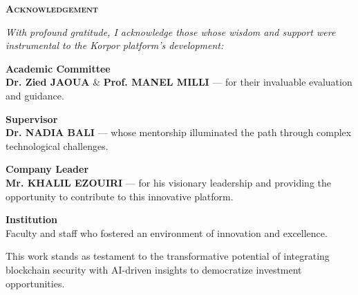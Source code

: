 \thispagestyle{empty}


\begin{center}
    \begin{minipage}{0.75\textwidth}
        \begin{center}
            \Large\textcolor{primary}{\scshape\bfseries Acknowledgement}
        \end{center}
    \end{minipage}
\end{center}

\vspace{1cm}

\begin{center}
\begin{minipage}{0.75\textwidth}
\setlength{\parindent}{0pt}
\setlength{\parskip}{1em}

{\small\itshape With profound gratitude, I acknowledge those whose wisdom and support were instrumental to the Korpor platform's development:}

\vspace{0.5cm}

{\noindent\textbf{\textcolor{primary}{Academic Committee}}\\
\textbf{Dr. Zied JAOUA} \& \textbf{Prof. MANEL MILLI} — for their invaluable evaluation and guidance.}

\vspace{0.4cm}

{\noindent\textbf{\textcolor{primary}{Supervisor}}\\
\textbf{Dr. NADIA BALI} — whose mentorship illuminated the path through complex technological challenges.}

\vspace{0.4cm}

{\noindent\textbf{\textcolor{primary}{Company Leader}}\\
\textbf{Mr. KHALIL EZOUIRI} — for his visionary leadership and providing the opportunity to contribute to this innovative platform.}

\vspace{0.4cm}

{\noindent\textbf{\textcolor{primary}{Institution}}\\
Faculty and staff who fostered an environment of innovation and excellence.}

\vspace{0.7cm}

{\small This work stands as testament to the transformative potential of integrating blockchain security with AI-driven insights to democratize investment opportunities.}


\end{minipage}
\end{center}
